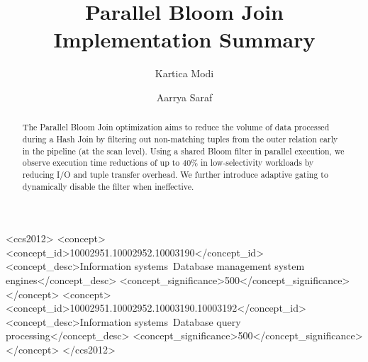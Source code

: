 \documentclass[sigconf,nonacm]{acmart}
\begin{document}
\title{Parallel Bloom Join Implementation Summary}

\author{Kartica Modi}

\author{Aarrya Saraf}

\renewcommand{\shortauthors}{Modi and Saraf}

\begin{abstract}
The Parallel Bloom Join optimization aims to reduce the volume of data processed during a Hash Join by filtering out non-matching tuples from the outer relation early in the pipeline (at the scan level). Using a shared Bloom filter in parallel execution, we observe execution time reductions of up to 40\% in low-selectivity workloads by reducing I/O and tuple transfer overhead. We further introduce adaptive gating to dynamically disable the filter when ineffective.
\end{abstract}

\begin{CCSXML}
<ccs2012>
<concept>
<concept_id>10002951.10002952.10003190</concept_id>
<concept_desc>Information systems~Database management system engines</concept_desc>
<concept_significance>500</concept_significance>
</concept>
<concept>
<concept_id>10002951.10002952.10003190.10003192</concept_id>
<concept_desc>Information systems~Database query processing</concept_desc>
<concept_significance>500</concept_significance>
</concept>
</ccs2012>
\end{CCSXML}



\maketitle
\end{document}
